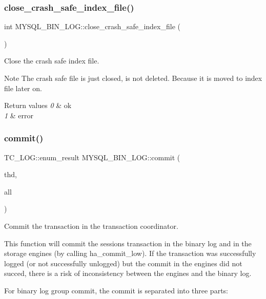 \subsubsection{\texorpdfstring{close\+\_\+crash\+\_\+safe\+\_\+index\+\_\+file()}{close\_crash\_safe\_index\_file()}}
{\footnotesize\ttfamily int M\+Y\+S\+Q\+L\+\_\+\+B\+I\+N\+\_\+\+L\+O\+G\+::close\+\_\+crash\+\_\+safe\+\_\+index\+\_\+file (\begin{DoxyParamCaption}{ }\end{DoxyParamCaption})}

Close the crash safe index file.

\begin{DoxyNote}{Note}
The crash safe file is just closed, is not deleted. Because it is moved to index file later on. 
\end{DoxyNote}

\begin{DoxyRetVals}{Return values}
{\em 0} & ok \\
\hline
{\em 1} & error \\
\hline
\end{DoxyRetVals}
\mbox{\label{group__Binary__Log_ga94fdcfcfb5d2c85ca2a114ad2115b20e}} 
\subsubsection{\texorpdfstring{commit()}{commit()}}
{\footnotesize\ttfamily T\+C\+\_\+\+L\+O\+G\+::enum\+\_\+result M\+Y\+S\+Q\+L\+\_\+\+B\+I\+N\+\_\+\+L\+O\+G\+::commit (\begin{DoxyParamCaption}\item[{T\+HD $\ast$}]{thd,  }\item[{bool}]{all }\end{DoxyParamCaption})\hspace{0.3cm}{\ttfamily [virtual]}}

Commit the transaction in the transaction coordinator.

This function will commit the sessions transaction in the binary log and in the storage engines (by calling {\ttfamily ha\+\_\+commit\+\_\+low}). If the transaction was successfully logged (or not successfully unlogged) but the commit in the engines did not succed, there is a risk of inconsistency between the engines and the binary log.

For binary log group commit, the commit is separated into three parts\+:


